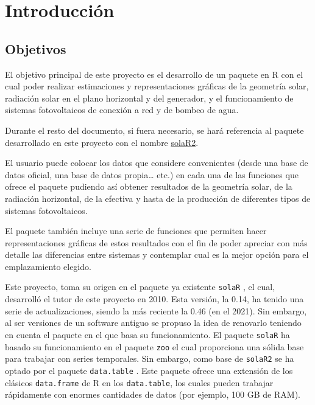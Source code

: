 \chapter{Introducción}
\label{chap:introduccion}

\section{Objetivos}
\label{sec:orga469e6d}
\label{sec:objetivos}
El objetivo principal de este proyecto es el desarrollo de un paquete en R \cite{rcoreteam23} con el cual poder realizar estimaciones y representaciones gráficas de la geometría solar, radiación solar en el plano horizontal y del generador, y el funcionamiento de sistemas fotovoltaicos de conexión a red y de bombeo de agua.

Durante el resto del documento, si fuera necesario, se hará referencia al paquete desarrollado en este proyecto con el nombre \href{https://solarization.github.io/solaR2/}{solaR2}.

El usuario puede colocar los datos que considere convenientes (desde una base de datos oficial, una base de datos propia\ldots{} etc.) en cada una de las funciones que ofrece el paquete pudiendo así obtener resultados de la geometría solar, de la radiación horizontal, de la efectiva y hasta de la producción de diferentes tipos de sistemas fotovoltaicos.

El paquete también incluye una serie de funciones que permiten hacer representaciones gráficas de estos resultados con el fin de poder apreciar con más detalle las diferencias entre sistemas y contemplar cual es la mejor opción para el emplazamiento elegido.

Este proyecto, toma su origen en el paquete ya existente \texttt{solaR} \cite{perpinan12}, el cual, desarrolló el tutor de este proyecto en 2010. Esta versión, la 0.14, ha tenido una serie de actualizaciones, siendo la más reciente la 0.46 (en el 2021). Sin embargo, al ser versiones de un software antiguo se propuso la idea de renovarlo teniendo en cuenta el paquete en el que basa su funcionamiento. El paquete \texttt{solaR} ha basado su funcionamiento en el paquete \texttt{zoo} \cite{zeileis05} el cual proporciona una sólida base para trabajar con series temporales. Sin embargo, como base de \texttt{solaR2} se ha optado por el paquete \texttt{data.table} \cite{barrett24}. Este paquete ofrece una extensión de los clásicos \texttt{data.frame} de R en los \texttt{data.table}, los cuales pueden trabajar rápidamente con enormes cantidades de datos (por ejemplo, 100 GB de RAM).

